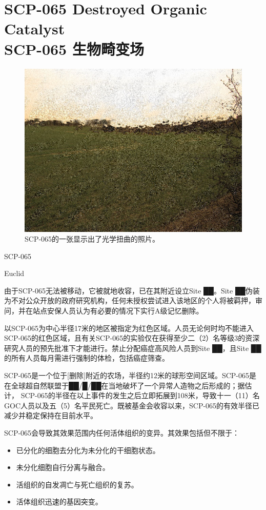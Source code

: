 \chapter[SCP-065 生物畸变场]{
    SCP-065 Destroyed Organic Catalyst\\
    SCP-065 生物畸变场
}

\label{chap:SCP-065}

\begin{figure}[H]
    \centering
    \includegraphics[width=0.5\linewidth]{images/SCP.065.jpg}
    \caption*{SCP-065的一张显示出了光学扭曲的照片。}
\end{figure}

SCP-065

Euclid

由于SCP-065无法被移动，它被就地收容，已在其附近设立Site ██。Site ██伪装为不对公众开放的政府研究机构，任何未授权尝试进入该地区的个人将被羁押，审问，并在站点安保人员认为有必要的情况下实行A级记忆删除。

以SCP-065为中心半径17米的地区被指定为红色区域。人员无论何时均不能进入SCP-065的红色区域，且有关SCP-065的实验仅在获得至少二（2）名等级3的资深研究人员的预先批准下才能进行。禁止分配癌症高风险人员到Site ██，且Site ██的所有人员每月需进行强制的体检，包括癌症筛查。

SCP-065是一个位于{[}删除]附近的农场，半径约12米的球形空间区域。SCP-065是在全球超自然联盟于██\slash █\slash ██在当地破坏了一个异常人造物之后形成的；据估计， SCP-065的半径在以上事件的发生之后立即拓展到108米，导致十一（11）名GOC人员以及五（5）名平民死亡。既被基金会收容以来，SCP-065的有效半径已减少并稳定保持在目前水平。

SCP-065会导致其效果范围内任何活体组织的变异。其效果包括但不限于：

\begin{itemize}
\item 已分化的细胞去分化为未分化的干细胞状态。
\item 未分化细胞自行分离与融合。
\item 活组织的自发凋亡与死亡组织的复苏。
\item 活体组织迅速的基因突变。
\end{itemize}

